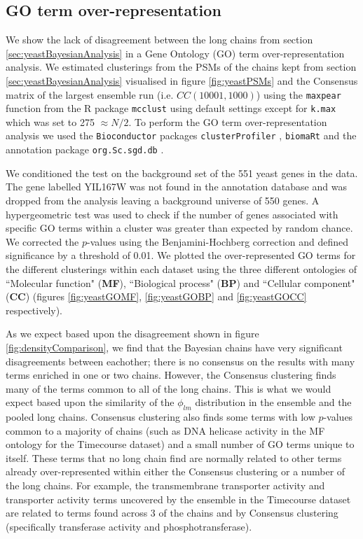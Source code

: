 \documentclass[]{article}
\begin{document}
\subsection{GO term over-representation} \label{sec:goTermOverRep}
We show the lack of disagreement between the long chains from section \ref{sec:yeastBayesianAnalysis} in a Gene Ontology (GO) term over-representation analysis. We estimated clusterings from the PSMs of the chains kept from section \ref{sec:yeastBayesianAnalysis} visualised in figure \ref{fig:yeastPSMs} and the Consensus matrix of the largest ensemble run (i.e. $CC(10001, 1000)$) using the \texttt{maxpear} function from the R package \texttt{mcclust} \cite{fritsch2012mcclust} using default settings except for \texttt{k.max} which was set to 275 $\approx N/2$. To perform the GO term over-representation analysis we used the \texttt{Bioconductor} packages \texttt{clusterProfiler} \citep{yu2012clusterProfiler}, \texttt{biomaRt} \citep{durinck2009mapping} and the annotation package \texttt{org.Sc.sgd.db} \citep{carlson2014org}.

We conditioned the test on the background set of the 551 yeast genes in the data. The gene labelled YIL167W was not found in the annotation database and was dropped from the analysis leaving a background universe of 550 genes. A hypergeometric test was used to check if the number of genes associated with specific GO terms within a cluster was greater than expected by random chance. We corrected the $p$-values using the Benjamini-Hochberg correction \citep{benjamini1995controlling} and defined significance by a threshold of 0.01. We plotted the over-represented GO terms for the different clusterings within each dataset using the three different ontologies of ``Molecular function" (\textbf{MF}), ``Biological process" (\textbf{BP}) and ``Cellular component" (\textbf{CC}) (figures \ref{fig:yeastGOMF}, \ref{fig:yeastGOBP} and \ref{fig:yeastGOCC} respectively). 

As we expect based upon the disagreement shown in figure \ref{fig:densityComparison}, we find that the Bayesian chains have very significant disagreements between eachother; there is no consensus on the results with many terms enriched in one or two chains. However, the Consensus clustering finds many of the terms common to all of the long chains. This is what we would expect based upon the similarity of the $\phi_{lm}$ distribution in the ensemble and the pooled long chains. Consensus clustering also finds some terms with low $p$-values common to a majority of chains (such as DNA helicase activity in the MF ontology for the Timecourse dataset) and a small number of GO terms unique to itself. These terms that no long chain find are normally related to other terms already over-represented within either the Consensus clustering or a number of the long chains. For example, the transmembrane transporter activity and transporter activity terms uncovered by the ensemble in the Timecourse dataset are related to terms found across 3 of the chains and by Consensus clustering (specifically transferase activity and phosphotransferase). 
\end{document}

